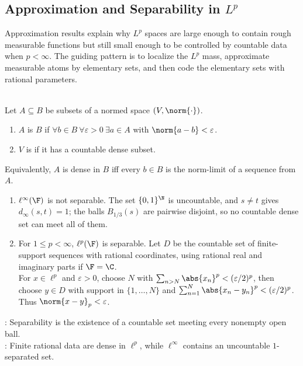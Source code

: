 \subsection{Approximation and Separability in \texorpdfstring{$L^p$}{Lp}}

Approximation results explain why $L^p$ spaces are large enough to contain rough measurable functions but still small enough to be controlled by countable data when $p<\infty$. The guiding pattern is to localize the $L^p$ mass, approximate measurable atoms by elementary sets, and then code the elementary sets with rational parameters.

\begin{definition} \label{def:normed-density-and-separability-lp} \\
Let $A\subseteq B$ be subsets of a normed space $(V,\norm{\cdot})$.
\begin{enumerate}[label=(\roman*)]
\setlength{\itemsep}{0pt}
\item $A$ is  $B$ if $\forall b\in B\ \forall\varepsilon>0\ \exists a\in A$ with $\norm{a-b}<\varepsilon$.
\item $V$ is  if it has a countable dense subset.
\end{enumerate}
Equivalently, $A$ is dense in $B$ iff every $b\in B$ is the norm-limit of a sequence from $A$.
\end{definition}

\begin{example} \label{ex:sequence-space-separability} 
\begin{enumerate}[label=(\roman*)]
\setlength{\itemsep}{0pt}
\item $\ell^\infty(\F)$ is not separable. The set $\{0,1\}^{\N}$ is uncountable, and $s\ne t$ gives $d_\infty(s,t)=1$; the balls $B_{1/3}(s)$ are pairwise disjoint, so no countable dense set can meet all of them.
\item For $1\leq p<\infty$, $\ell^p(\F)$ is separable. Let $D$ be the countable set of finite-support sequences with rational coordinates, using rational real and imaginary parts if $\F=\C$.\\
For $x\in\ell^p$ and $\varepsilon>0$, choose $N$ with $\sum_{n>N}\abs{x_n}^p<(\varepsilon/2)^p$, then choose $y\in D$ with support in $\{1,\ldots,N\}$ and $\sum_{n=1}^N\abs{x_n-y_n}^p<(\varepsilon/2)^p$. Thus $\norm{x-y}_p<\varepsilon$.
\end{enumerate}
: Separability is the existence of a countable set meeting every nonempty open ball.\\
: Finite rational data are dense in $\ell^p$, while $\ell^\infty$ contains an uncountable $1$-separated set.
\end{example}

